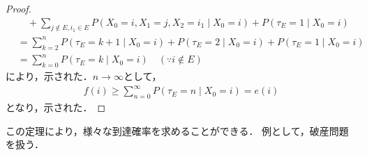 \documentclass[dvipdfmx,autodetect-engine]{jsarticle}
\theoremstyle{remark}
\theoremstyle{definition}
\begin{document}
\begin{proof}
\begin{align}
            &\quad + \sum_{j \notin E,i_1 \in E} P(X_0=i,X_1=j,X_2=i_1 \mid X_0=i) 
            + P(\tau_{E}=1\mid X_0 = i)\\
            &= \sum_{k = 2}^{n} P(\tau_{E} = k+1\mid X_0 = i) 
            + P(\tau_{E} = 2 \mid X_0 = i) + P(\tau_{E}=1\mid X_0 = i)\\
            &= \sum_{k=0}^{n} P(\tau_{E} = k \mid X_0 = i) \quad (\because i \notin E)
    \end{align}
    により，示された．$n \to \infty$として，
    \begin{align}
        f(i) \geq \sum_{n=0}^{\infty} P(\tau_{E}=n \mid X_0 =i) = e(i)
    \end{align}
    となり，示された．
\end{proof}


この定理により，様々な到達確率を求めることができる．
例として，破産問題を扱う．
\end{document}
